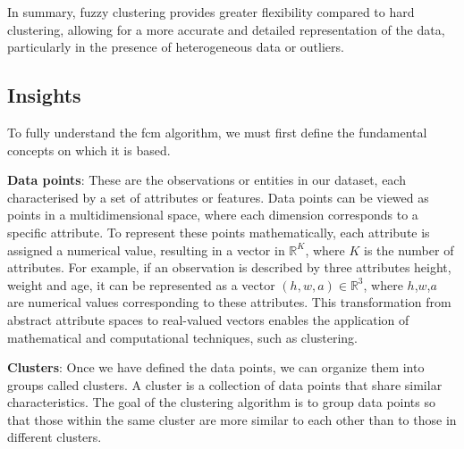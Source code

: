 \noindent In summary, fuzzy clustering provides greater flexibility compared to hard clustering, allowing for a more accurate and detailed representation of the data, particularly in the presence of heterogeneous data or outliers.

\subsection{Insights}
To fully understand the \gls{fcm} algorithm, we must first define the fundamental concepts on which it is based.

\noindent \textbf{Data points}: These are the observations or entities in our dataset, each characterised by a set of attributes or features. Data points can be viewed as points in a multidimensional space, where each dimension corresponds to a specific attribute. To represent these points mathematically, each attribute is assigned a numerical value, resulting in a vector in $\mathbb{R}^K$, where $K$ is the number of attributes. For example, if an observation is described by three attributes height, weight and age, it can be represented as a vector $(h,w,a)\in\mathbb{R}^3$, where $h$,$w$,$a$ are numerical values corresponding to these attributes. This transformation from abstract attribute spaces to real-valued vectors enables the application of mathematical and computational techniques, such as clustering.

\noindent \textbf{Clusters}: Once we have defined the data points, we can organize them into groups called clusters. A cluster is a collection of data points that share similar characteristics. The goal of the clustering algorithm is to group data points so that those within the same cluster are more similar to each other than to those in different clusters.

